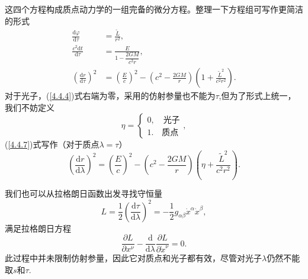 \documentclass[11pt, a4paper, oneside, onecolumn]{ctexart}
\numberwithin{equation}{subsection}
\begin{document}
\newpage
这四个方程构成质点动力学的一组完备的微分方程。整理一下方程组可写作更简洁的形式
\begin{align}
\frac{\mathrm{d}\varphi}{\mathrm{d}\tau}&=\frac{\widetilde{L}}{r^{2}},\\
\frac{c^{2}\mathrm{d}t}{\mathrm{d}\tau}&=\frac{E}{1-\dfrac{2GM}{c^{2}r}},\\
\left(\frac{\mathrm{d}r}{\mathrm{d}\tau}\right)^{2}&=\left(\frac{E}{c}\right)^{2}-\left(c^{2}-\frac{2GM}{r}\right)\left(1+\frac{\widetilde{L}^{2}}{c^{2}r^{2}}\right).\label{4.4.7}
\end{align}
对于光子，(\ref{4.4.4})式右端为零，采用的仿射参量也不能为$\tau$,但为了形式上统一，我们不妨定义
\begin{equation}
\eta=
\begin{cases}
0,\quad\text{光子}\\
1.\quad\text{质点}
\end{cases},
\end{equation}
(\ref{4.4.7})式写作（对于质点$\lambda=\tau$）
\begin{equation}
\left(\frac{\mathrm{d}r}{\mathrm{d}\lambda}\right)^{2}=\left(\frac{E}{c}\right)^{2}-\left(c^{2}-\frac{2GM}{r}\right)\left(\eta+\frac{\widetilde{L}^{2}}{c^{2}r^{2}}\right).
\end{equation}

我们也可以从拉格朗日函数出发寻找守恒量
\begin{equation}
L=\frac12\left(\frac{\mathrm{d}\tau}{\mathrm{d}\lambda}\right)^{2}=-\frac12g_{\alpha\beta}\dot{x}^{\alpha}\dot{x}^{\beta},
\end{equation}
满足拉格朗日方程
\begin{equation}
\frac{\partial{}L}{\partial{}x^{\nu}}-\frac{\mathrm{d}}{\mathrm{d}\lambda}\frac{\partial{}L}{\partial{}\dot{x}^{\nu}}=0.
\end{equation}
此过程中并未限制仿射参量，因此它对质点和光子都有效，尽管对光子$\lambda$仍然不能取$s$和$\tau$.
\end{document}
